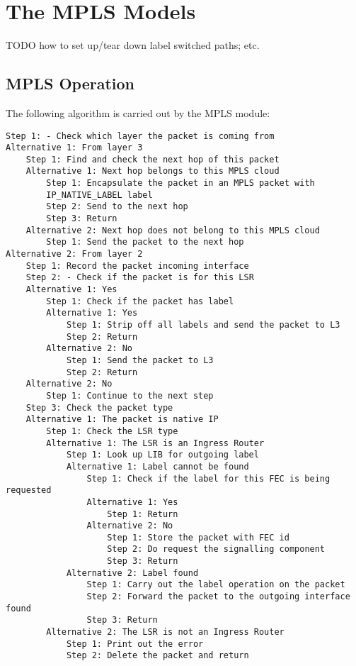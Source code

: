 \chapter{The MPLS Models}
\label{cha:mpls}

TODO how to set up/tear down label switched paths; etc.

\section{MPLS Operation}

The following algorithm is carried out by the MPLS module:

\begin{verbatim}
Step 1: - Check which layer the packet is coming from
Alternative 1: From layer 3
    Step 1: Find and check the next hop of this packet
    Alternative 1: Next hop belongs to this MPLS cloud
        Step 1: Encapsulate the packet in an MPLS packet with
        IP_NATIVE_LABEL label
        Step 2: Send to the next hop
        Step 3: Return
    Alternative 2: Next hop does not belong to this MPLS cloud
        Step 1: Send the packet to the next hop
Alternative 2: From layer 2
    Step 1: Record the packet incoming interface
    Step 2: - Check if the packet is for this LSR
    Alternative 1: Yes
        Step 1: Check if the packet has label
        Alternative 1: Yes
            Step 1: Strip off all labels and send the packet to L3
            Step 2: Return
        Alternative 2: No
            Step 1: Send the packet to L3
            Step 2: Return
    Alternative 2: No
        Step 1: Continue to the next step
    Step 3: Check the packet type
    Alternative 1: The packet is native IP
        Step 1: Check the LSR type
        Alternative 1: The LSR is an Ingress Router
            Step 1: Look up LIB for outgoing label
            Alternative 1: Label cannot be found
                Step 1: Check if the label for this FEC is being requested
                Alternative 1: Yes
                    Step 1: Return
                Alternative 2: No
                    Step 1: Store the packet with FEC id
                    Step 2: Do request the signalling component
                    Step 3: Return
            Alternative 2: Label found
                Step 1: Carry out the label operation on the packet
                Step 2: Forward the packet to the outgoing interface found
                Step 3: Return
        Alternative 2: The LSR is not an Ingress Router
            Step 1: Print out the error
            Step 2: Delete the packet and return

\end{verbatim}
